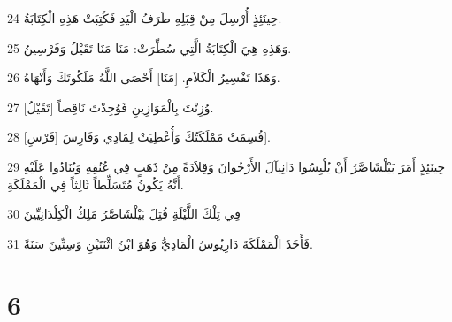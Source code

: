 \par 24 حِينَئِذٍ أُرْسِلَ مِنْ قِبَلِهِ طَرَفُ الْيَدِ فَكُتِبَتْ هَذِهِ الْكِتَابَةُ.
\par 25 وَهَذِهِ هِيَ الْكِتَابَةُ الَّتِي سُطِّرَتْ: مَنَا مَنَا تَقَيْلُ وَفَرْسِينُ.
\par 26 وَهَذَا تَفْسِيرُ الْكَلاَمِ. [مَنَا] أَحْصَى اللَّهُ مَلَكُوتَكَ وَأَنْهَاهُ.
\par 27 [تَقَيْلُ] وُزِنْتَ بِالْمَوَازِينِ فَوُجِدْتَ نَاقِصاً.
\par 28 [فَرْسِ] قُسِمَتْ مَمْلَكَتُكَ وَأُعْطِيَتْ لِمَادِي وَفَارِسَ].
\par 29 حِينَئِذٍ أَمَرَ بَيْلْشَاصَّرُ أَنْ يُلْبِسُوا دَانِيآلَ الأَرْجُوانَ وَقِلاَدَةً مِنْ ذَهَبٍ فِي عُنُقِهِ وَيُنَادُوا عَلَيْهِ أَنَّهُ يَكُونُ مُتَسَلِّطاً ثَالِثاً فِي الْمَمْلَكَةِ.
\par 30 فِي تِلْكَ اللَّيْلَةِ قُتِلَ بَيْلْشَاصَّرُ مَلِكُ الْكِلْدَانِيِّينَ
\par 31 فَأَخَذَ الْمَمْلَكَةَ دَارِيُوسُ الْمَادِيُّ وَهُوَ ابْنُ اثْنَتَيْنِ وَسِتِّينَ سَنَةً.

\chapter{6}

